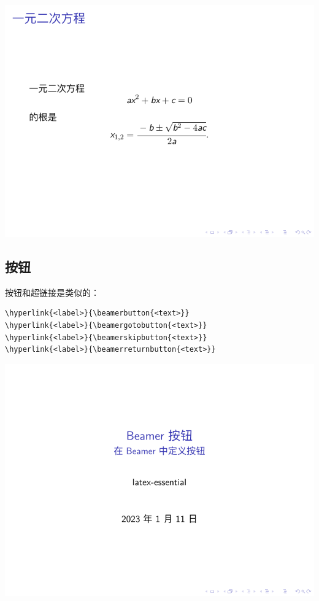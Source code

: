 \begin{column}{0.5\textwidth}
\includegraphics[page=2]{examples/beamer/hyperlink-and-button1.pdf}

\subsection{按钮}

按钮和超链接是类似的：

\begin{verbatim}
\hyperlink{<label>}{\beamerbutton{<text>}}
\hyperlink{<label>}{\beamergotobutton{<text>}}
\hyperlink{<label>}{\beamerskipbutton{<text>}}
\hyperlink{<label>}{\beamerreturnbutton{<text>}}
\end{verbatim}

\includegraphics[page=2]{examples/beamer/hyperlink-and-button2.pdf}


\end{column}
